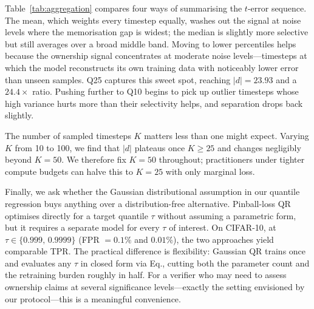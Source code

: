 \documentclass{article}
\begin{document}
Table~\ref{tab:aggregation} compares four ways of summarising the
$t$-error sequence.  The mean, which weights every timestep equally,
washes out the signal at noise levels where the memorisation gap is
widest; the median is slightly more selective but still averages over
a broad middle band.  Moving to lower percentiles helps because the
ownership signal concentrates at moderate noise levels---timesteps at
which the model reconstructs its own training data with noticeably
lower error than unseen samples.  Q25 captures this sweet spot,
reaching $|d|=23.93$ and a $24.4\times$ ratio.  Pushing further to
Q10 begins to pick up outlier timesteps whose high variance hurts more
than their selectivity helps, and separation drops back slightly.

The number of sampled timesteps $K$ matters less than one might
expect.  Varying $K$ from 10 to 100, we find that $|d|$ plateaus once
$K\!\geq\!25$ and changes negligibly beyond $K\!=\!50$.  We therefore
fix $K\!=\!50$ throughout; practitioners under tighter compute budgets
can halve this to $K\!=\!25$ with only marginal loss.

Finally, we ask whether the Gaussian distributional assumption in our
quantile regression buys anything over a distribution-free
alternative.  Pinball-loss QR optimises directly for a target quantile
$\tau$ without assuming a parametric form, but it requires a separate
model for every $\tau$ of interest.  On CIFAR-10, at
$\tau\!\in\!\{0.999,\,0.9999\}$ (FPR $=0.1\%$ and $0.01\%$), the two
approaches yield comparable TPR.  The practical difference is
flexibility: Gaussian QR trains once and evaluates any $\tau$ in
closed form via Eq., cutting both the
parameter count and the retraining burden roughly in half.  For a
verifier who may need to assess ownership claims at several
significance levels---exactly the setting envisioned by our
protocol---this is a meaningful convenience.


\end{document}
